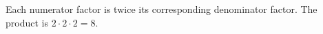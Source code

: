 Each numerator factor is twice its corresponding denominator factor. The product is $2\cdot2\cdot2=\boxed8$.
